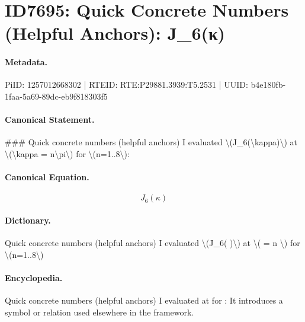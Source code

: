 \section*{ID7695: Quick Concrete Numbers (Helpful Anchors): J\_6(κ)}
\paragraph{Metadata.}
PiID: 1257012668302 | RTEID: RTE:P29881.3939:T5.2531 | UUID: b4e180fb-1faa-5a69-89dc-eb9f818303f5

\paragraph{Canonical Statement.}
\#\#\# Quick concrete numbers (helpful anchors) I evaluated \textbackslash{}(J\_6(\textbackslash{}kappa)\textbackslash{}) at \textbackslash{}(\textbackslash{}kappa = n\textbackslash{}pi\textbackslash{}) for \textbackslash{}(n=1..8\textbackslash{}):

\paragraph{Canonical Equation.}
\[
J_6(\kappa)
\]

\paragraph{Dictionary.}
Quick concrete numbers (helpful anchors) I evaluated \textbackslash{}(J\_6( )\textbackslash{}) at \textbackslash{}( = n \textbackslash{}) for \textbackslash{}(n=1..8\textbackslash{})

\paragraph{Encyclopedia.}
Quick concrete numbers (helpful anchors) I evaluated at for : It introduces a symbol or relation used elsewhere in the framework.
